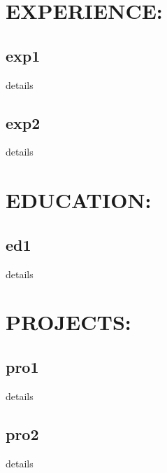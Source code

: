 \documentclass{article}%
\begin{document}
%
\normalsize%
\section{EXPERIENCE: }%
\label{sec:EXPERIENCE}%
\subsection{exp1}%
\label{subsec:exp1}%
details

%
\subsection{exp2}%
\label{subsec:exp2}%
details

%
\section{EDUCATION: }%
\label{sec:EDUCATION}%
\subsection{ed1}%
\label{subsec:ed1}%
details

%
\section{PROJECTS: }%
\label{sec:PROJECTS}%
\subsection{pro1}%
\label{subsec:pro1}%
details

%
\subsection{pro2}%
\label{subsec:pro2}%
details

%
\end{document}
